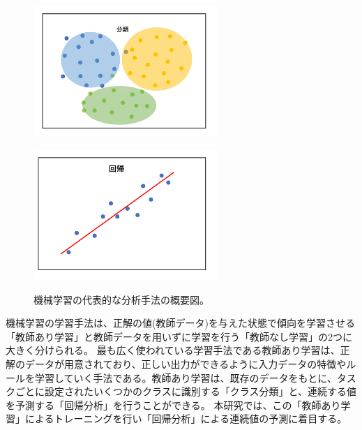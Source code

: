 \begin{figure}[tb]
  \centering
    \begin{minipage}[b]{0.4\linewidth}
        \centering
        \includegraphics[clip, width=7cm]{fig/4/classification.pdf}
        \hspace{-1cm}
        \label{fig:class}
    \end{minipage}
    \hfill
    \begin{minipage}[b]{0.4\linewidth}
        \centering
        \includegraphics[clip, width=7cm]{fig/4/regression.pdf}
        \hspace{-1cm}
        \label{fig:regre}
    \end{minipage}
  \caption{機械学習の代表的な分析手法の概要図。}
  \label{fig:fit_def}
\end{figure}

機械学習の学習手法は、正解の値(教師データ)を与えた状態で傾向を学習させる「教師あり学習」と教師データを用いずに学習を行う「教師なし学習」の2つに大きく分けられる。
最も広く使われている学習手法である教師あり学習は、正解のデータが用意されており、正しい出力ができるように入力データの特徴やルールを学習していく手法である。教師あり学習は、既存のデータをもとに、タスクごとに設定されたいくつかのクラスに識別する「クラス分類」と、連続する値を予測する「回帰分析」を行うことができる。
本研究では、この「教師あり学習」によるトレーニングを行い「回帰分析」による連続値の予測に着目する。

